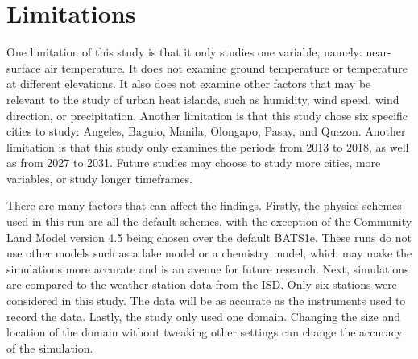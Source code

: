 \section{Limitations}
	One limitation of this study is that it only studies one variable, namely: near-surface air temperature.
	It does not examine ground temperature or temperature at different elevations.
	It also does not examine other factors that may be relevant to the study of urban heat islands, such as humidity, wind speed, wind direction, or precipitation. 
	Another limitation is that this study chose six specific cities to study: Angeles, Baguio, Manila, Olongapo, Pasay, and Quezon.
	Another limitation is that this study only examines the periods from 2013 to 2018, as well as from 2027 to 2031.
	Future studies may choose to study more cities, more variables, or study longer timeframes.
	
	There are many factors that can affect the findings. 
	Firstly, the physics schemes used in this run are all the default schemes, with the exception of the Community Land Model version 4.5 being chosen over the default BATS1e. 
	These runs do not use other models such as a lake model or a chemistry model, which may make the simulations more accurate and is an avenue for future research.
	Next, simulations are compared to the weather station data from the ISD.
	Only six stations were considered in this study.
	The data will be as accurate as the instruments used to record the data.
	Lastly, the study only used one domain.
	Changing the size and location of the domain without tweaking other settings can change the accuracy of the simulation.